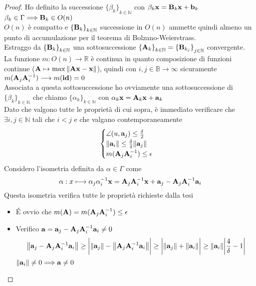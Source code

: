 \documentclass[10pt,a4paper]{article}
\begin{document}
\begin{proof}
Ho definito la successione ${ \{\beta_k \}}_{k \in \mathbb{N}}$  con  $\beta_k \vb{x = B}_k \vb{x + b}_k$   $\beta_k \in \Gamma \Longrightarrow \vb{B}_k \in O(n)$  \\
$O(n)$  è compatto e ${ \{\vb{B}_k \} }_{k \in \mathbb{N}}$ successione in  $O(n)$  ammette quindi almeno un punto di accumulazione per il teorema di Bolzano-Weierstrass. \\
Estraggo da ${ \{ \vb{B}_k \}}_{k \in \mathbb{N}}$  una sottosuccessione  $ { \{ \vb{A}_k \} }_{k \in \mathbb{N}} = { \{ \vb{B}_{k_j} \} }_{j \in \mathbb{N}}$  convergente.  \\
La funzione  $ m: O(n) \longrightarrow \mathbb{R}$  è continua in quanto composizione di funzioni continue ($ \vb{A} \mapsto \max{\norm{\vb{Ax-x}}} $), quindi con $i,j \in \mathbb{B} \longrightarrow \infty $ sicuramente $m(\vb{A}_j \vb{A}^{-1}_i) \longrightarrow m(\vb{id}) = 0 $ \\
Associata a questa sottosuccessione ho ovviamente una sottosuccessione di ${ \{\beta_k \}}_{k \in \mathbb{N}}$ che chiamo ${ \{\alpha_k \}}_{k \in \mathbb{N}}$ con  $\alpha_k \vb{x = A}_k \vb{x + a}_k$ \\


Dato che valgono tutte le proprietà di cui sopra, è immediato verificare che $\exists i,j \in \mathbb{N} $  tali che  $ i < j$  e che valgano contemporaneamente
\[ \begin{cases} \angle(u, \vb{a}_j ) \leq \frac{\delta}{2} \\
\norm{\vb{a}_i} \leq \frac{\delta}{4}\norm{\vb{a}_j} \\
m( \vb{A}_j \vb{A}^{-1}_i ) \leq \epsilon  \end{cases} \]
Considero l'isometria definita da $\alpha \in \Gamma$ come 
\[ \alpha : x \longmapsto \alpha_j \alpha^{-1}_i \vb{x} = \vb{A}_j \vb{A}^{-1}_i \vb{x} + \vb{a}_j - \vb{A}_j \vb{A}^{-1}_i \vb{a}_i\]
Questa isometria verifica tutte le proprietà richieste dalla tesi

\begin{itemize}
\item \'E ovvio che $m(\vb{A}) = m(\vb{A}_j \vb{A}^{-1}_i) \leq \epsilon$ 
\item Verifico  $\vb{a}= \vb{a}_j - \vb{A}_j \vb{A}^{-1}_i \vb{a}_i \neq 0$ 
\[ \norm{\vb{a}_j - \vb{A}_j \vb{A}^{-1}_i \vb{a}_i} \geq \bigg| \norm{\vb{a}_j} - \norm{ \vb{A}_j \vb{A}^{-1}_i \vb{a}_i } \bigg| \geq \bigg| \norm{\vb{a}_j } + \norm{\vb{a}_i} \bigg| \geq \norm{\vb{a}_i} \bigg| \frac{4}{\delta} -1 \bigg| \]
$\norm{\vb{a}_i} \neq 0 \Longrightarrow \vb{a} \neq 0$
 

\end{itemize}
\end{proof}
\end{document}
